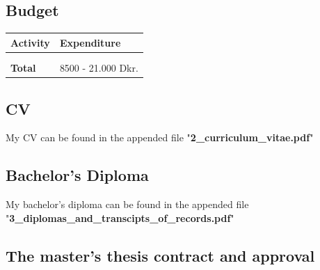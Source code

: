 \documentclass[a4paper]{article}
\begin{document}
\subsection{Budget}

\begin{center}
\begin{tabular}{  m{10cm} m{4cm} } 

	\hline
	\textbf{Activity}    & \textbf{Expenditure}\\
	\hline
	    &                               \\
 	    &                               \\
 	\hline
    \textbf{Total}       & 8500 - 21.000 Dkr.			    \\
    \hline

\end{tabular}
\end{center}


\pagebreak
\subsection{CV}

My CV can be found in the appended file "\textbf{2\_curriculum\_vitae.pdf}"

\subsection{Bachelor's Diploma}

My bachelor's diploma can be found in the appended file "\textbf{3\_diplomas\_and\_transcipts\_of\_records.pdf}"

\subsection{The master's thesis contract and approval}
\end{document}
